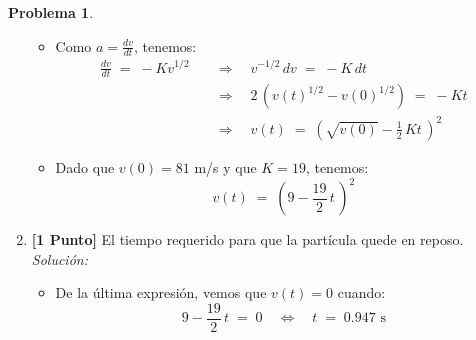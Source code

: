\documentclass[ a4paper, twoside, 11pt]{article}
\theoremstyle{definition}
\newtheorem{problem}[definition]{Problema}
\begin{document}
\begin{problem}
\begin{enumerate}[label=\alph*.]
\begin{itemize}
\item Como $a = \frac{dv}{dt}$, tenemos: 
\begin{align*}
\frac{dv}{dt} \; = \; -K v^{1/2} \quad
& \Longrightarrow \quad 
v^{-1/2} \, dv \; = \; -K \, dt \\
& \Longrightarrow \quad 
2 \, ( v(t)^{1/2} - v(0)^{1/2} ) \; = \; -K t \\
& \Longrightarrow \quad 
v(t) \; = \; \left( \sqrt{v(0)} - \frac{1}{2} \, K t \, \right)^2
\end{align*}
\item Dado que $v(0) = 81$ m/s y que $K = 19$, tenemos: 
\[
v(t) \; = \; 
\left( 9 - \frac{19}{2} \, t \, \right)^2
\]
\end{itemize}
\item \textbf{[1 Punto]} El tiempo requerido para que la part\'icula quede en reposo. \\ \emph{Soluci\'on:}
\begin{itemize}
\item De la \'ultima expresi\'on, vemos que $v(t) = 0$ cuando: 
\[
9 - \frac{19}{2} \, t \; = \; 0 \quad \Longleftrightarrow \quad
t \; = \; 0.947 \text{ s}
\]
\end{itemize}
\end{enumerate}

\end{problem}
\vspace{\baselineskip}
\end{document}
